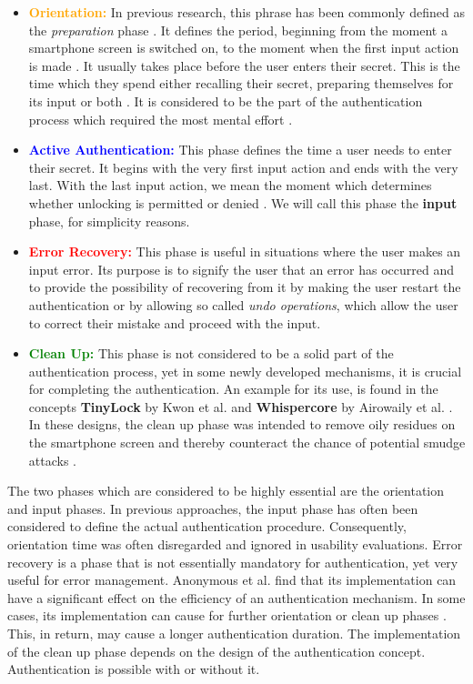 \begin{itemize}
    \item \textbf{\textcolor{orange}{Orientation:}} In previous research, this phrase has been commonly defined as the \textit{preparation} phase \cite{anonymous}. It defines the period, beginning from the moment a smartphone screen is switched on, to the moment when the first input action is made \cite{anonymous}. It usually takes place before the user enters their secret. This is the time which they spend either recalling their secret, preparing themselves for its input or both \cite{anonymous}. It is considered to be the part of the authentication process which required the most mental effort \cite{anonymous}.  
    \item \textbf{\textcolor{blue}{Active Authentication:}} This phase defines the time a user needs to enter their secret. It begins with the very first input action and ends with the very last. With the last input action, we mean the moment which determines whether unlocking is permitted or denied \cite{anonymous}. We will call this phase the \textbf{input} phase, for simplicity reasons.
    \item \textbf{\textcolor{red}{Error Recovery:}} This phase is useful in situations where the user makes an input error. Its purpose is to signify the user that an error has occurred and to provide the possibility of recovering from it by making the user restart the authentication or by allowing so called \textit{undo operations}, which allow the user to correct their mistake and proceed with the input. 
    \item \textbf{\textcolor{green}{Clean Up:}} This phase is not considered to be a solid part of the authentication process, yet in some newly developed mechanisms, it is crucial for completing the authentication. An example for its use, is found in the concepts \textbf{TinyLock} by Kwon et al. \cite{kwon} and \textbf{Whispercore} by Airowaily et al. \cite{Airowaily}. In these designs, the clean up phase was intended to remove oily residues on the smartphone screen and thereby counteract the chance of potential smudge attacks \cite{anonymous}. 
\end{itemize}

The two phases which are considered to be highly essential are the orientation and input phases. In previous approaches, the input phase has often been considered to define the actual authentication procedure. Consequently, orientation time was often disregarded and ignored in usability evaluations. Error recovery is a phase that is not essentially mandatory for authentication, yet very useful for error management. Anonymous et al. \cite{anonymous} find that its implementation can have a significant effect on the efficiency of an authentication mechanism. In some cases, its implementation can cause for further orientation or clean up phases \cite{anonymous}. This, in return, may cause a longer authentication duration. The implementation of the clean up phase depends on the design of the authentication concept. Authentication is possible with or without it. \\

